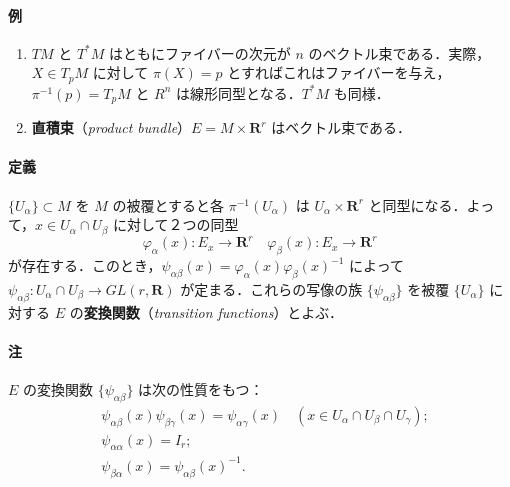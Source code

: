 \documentclass[10pt,b5paper,pandoc]{bxjsarticle}
\providecommand{\tightlist}{%
  \setlength{\itemsep}{0pt}\setlength{\parskip}{0pt}}
\let\oldparagraph\paragraph
\renewcommand{\paragraph}[1]{\oldparagraph{#1}\mbox{}}
\begin{document}
\hypertarget{ux4f8b}{%
\paragraph{例}\label{ux4f8b}}

\begin{enumerate}
\def\labelenumi{\roman{enumi})}
\tightlist
\item
  \(TM\) と \(T^*M\) はともにファイバーの次元が \(n\)
  のベクトル束である．実際，\(X \in T_pM\) に対して \(\pi(X) = p\)
  とすればこれはファイバーを与え，\(\pi^{-1}(p) = T_pM\) と \(R^n\)
  は線形同型となる．\(T^*M\) も同様．
\item
  \textbf{直積束}（\emph{product
  bundle}）\(E = M \times \boldsymbol{R}^r\) はベクトル束である．
\end{enumerate}

\hypertarget{ux5b9aux7fa9-1}{%
\paragraph{定義}\label{ux5b9aux7fa9-1}}

\(\{ U_\alpha \} \subset M\) を \(M\) の被覆とすると各
\(\pi^{-1}(U_\alpha)\) は \(U_\alpha \times \boldsymbol{R}^r\)
と同型になる．よって，\(x \in U_\alpha \cap U_\beta\) に対して２つの同型
\[
\varphi_\alpha(x) \colon E_x \to \boldsymbol{R}^r\quad \varphi_\beta(x) \colon E_x \to \boldsymbol{R}^r
\]
が存在する．このとき，\(\psi_{\alpha\beta}(x) = \varphi_\alpha(x) \varphi_\beta(x)^{-1}\)
によって
\(\psi_{\alpha\beta} \colon U_\alpha \cap U_\beta \to GL(r, \boldsymbol{R})\)
が定まる．これらの写像の族 \(\{ \psi_{\alpha\beta} \}\) を被覆
\(\{ U_\alpha \}\) に対する \(E\) の\textbf{変換関数}（\emph{transition
functions}）とよぶ．

\hypertarget{ux6ce8}{%
\paragraph{注}\label{ux6ce8}}

\(E\) の変換関数 \(\{ \psi_{\alpha\beta} \}\) は次の性質をもつ：
\begin{align}
&\psi_{\alpha\beta}(x) \psi_{\beta\gamma}(x) = \psi_{\alpha\gamma}(x)\quad (x \in U_\alpha \cap U_\beta \cap U_\gamma);\\
&\psi_{\alpha\alpha}(x) = I_r;\\
&\psi_{\beta\alpha}(x) = \psi_{\alpha\beta}(x)^{-1}.
\end{align}
\end{document}
